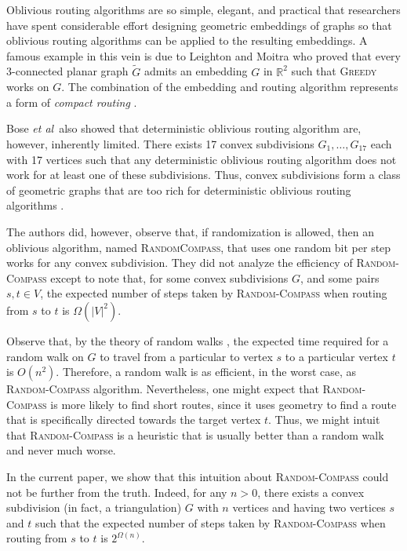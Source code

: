 \documentclass [letterpaper] {patmorin}
\newcommand{\R}{\mathbb{R}}
\newcommand{\etal}{\emph{et al}}
\begin{document}
Oblivious routing algorithms are so simple, elegant, and practical that researchers have spent considerable effort designing geometric embeddings of graphs so that oblivious routing algorithms can be applied to the resulting embeddings.  A famous example in this vein is due to Leighton and Moitra \cite{lm08} who proved that every 3-connected planar graph $\tilde G$ admits an embedding $G$ in $\R^2$ such that \textsc{Greedy} works on $G$.  The combination of the embedding and routing algorithm represents a form of \emph{compact routing} \cite{l94}.

Bose \etal\ also showed that deterministic oblivious routing algorithm are, however, inherently limited. There exists 17 convex subdivisions $G_1,\ldots,G_{17}$ each with 17 vertices such that any deterministic oblivious routing algorithm does not work for at least one of these subdivisions.  Thus, convex subdivisions form a class of geometric graphs that are too rich for deterministic oblivious routing algorithms \cite{bose02}.

The authors \cite{bose02,bose04} did, however, observe that, if randomization is allowed, then an oblivious algorithm, named \textsc{RandomCompass}, that uses one random bit per step works for any convex subdivision. They did not analyze the efficiency of \textsc{Random-Compass} except to note that, for some convex subdivisions $G$, and some pairs $s,t\in V$, the expected number of steps taken by \textsc{Random-Compass} when routing from $s$ to $t$ is $\Omega(|V|^2)$.

Observe that, by the theory of random walks \cite{X}, the expected time required for a random walk on $G$ to travel from a particular to vertex $s$ to a particular vertex $t$ is $O(n^2)$.  Therefore, a random walk is as efficient, in the worst case, as \textsc{Random-Compass} algorithm. Nevertheless, one might expect that \textsc{Random-Compass} is more likely to find short routes, since it uses geometry to find a route that is specifically directed towards the target vertex $t$.  Thus, we might intuit that \textsc{Random-Compass} is a heuristic that is usually better than a random walk and never much worse.

In the current paper, we show that this intuition about \textsc{Random-Compass} could not be further from the truth.  Indeed, for any $n>0$, there exists a convex subdivision (in fact, a triangulation) $G$ with $n$ vertices and having two vertices $s$ and $t$ such that the expected number of steps taken by \textsc{Random-Compass} when routing from $s$ to $t$ is $2^{\Omega(n)}$.
\end{document}
